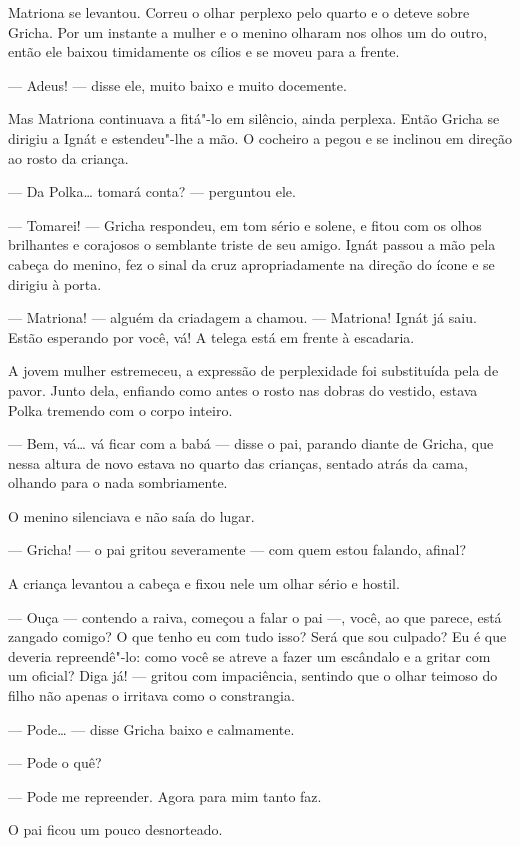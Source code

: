 Matriona se levantou. Correu o olhar perplexo pelo quarto e o deteve
sobre Gricha. Por um instante a mulher e o menino olharam nos olhos um
do outro, então ele baixou timidamente os cílios e se moveu para a
frente.

--- Adeus! --- disse ele, muito baixo e muito docemente.

Mas Matriona continuava a fitá"-lo em silêncio, ainda perplexa. Então
Gricha se dirigiu a Ignát e estendeu"-lhe a mão. O cocheiro a pegou e se
inclinou em direção ao rosto da criança.

--- Da Polka\ldots{} tomará conta? --- perguntou ele.

--- Tomarei! --- Gricha respondeu, em tom sério e solene, e fitou com os
olhos brilhantes e corajosos o semblante triste de seu amigo. Ignát
passou a mão pela cabeça do menino, fez o sinal da cruz apropriadamente
na direção do ícone e se dirigiu à porta.

--- Matriona! --- alguém da criadagem a chamou. --- Matriona! Ignát já
saiu. Estão esperando por você, vá! A telega está em frente à escadaria.

A jovem mulher estremeceu, a expressão de perplexidade foi substituída
pela de pavor. Junto dela, enfiando como antes o rosto nas dobras do
vestido, estava Polka tremendo com o corpo inteiro.

--- Bem, vá\ldots{} vá ficar com a babá --- disse o pai, parando diante de
Gricha, que nessa altura de novo estava no quarto das crianças, sentado
atrás da cama, olhando para o nada sombriamente.

O menino silenciava e não saía do lugar.

--- Gricha! --- o pai gritou severamente --- com quem estou falando,
afinal?

A criança levantou a cabeça e fixou nele um olhar sério e hostil.

--- Ouça --- contendo a raiva, começou a falar o pai ---, você, ao que
parece, está zangado comigo? O que tenho eu com tudo isso? Será que sou
culpado? Eu é que deveria repreendê"-lo: como você se atreve a fazer um
escândalo e a gritar com um oficial? Diga já! --- gritou com
impaciência, sentindo que o olhar teimoso do filho não apenas o
irritava como o constrangia.

--- Pode\ldots{} --- disse Gricha baixo e calmamente.

--- Pode o quê?

--- Pode me repreender. Agora para mim tanto faz.

O pai ficou um pouco desnorteado.

